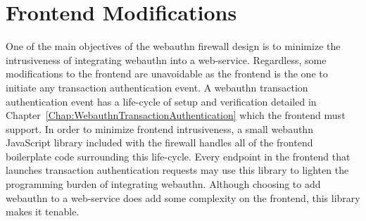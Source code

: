 \section{Frontend Modifications}

One of the main objectives of the webauthn firewall design is to minimize the intrusiveness of integrating webauthn into a web-service. Regardless, some modifications to the frontend are unavoidable as the frontend is the one to initiate any transaction authentication event. A webauthn transaction authentication event has a life-cycle of setup and verification detailed in Chapter~\ref{Chap:WebauthnTransactionAuthentication} which the frontend must support. In order to minimize frontend intrusiveness, a small webauthn JavaScript library included with the firewall handles all of the frontend boilerplate code surrounding this life-cycle. Every endpoint in the frontend that launches transaction authentication requests may use this library to lighten the programming burden of integrating webauthn. Although choosing to add webauthn to a web-service does add some complexity on the frontend, this library makes it tenable.






